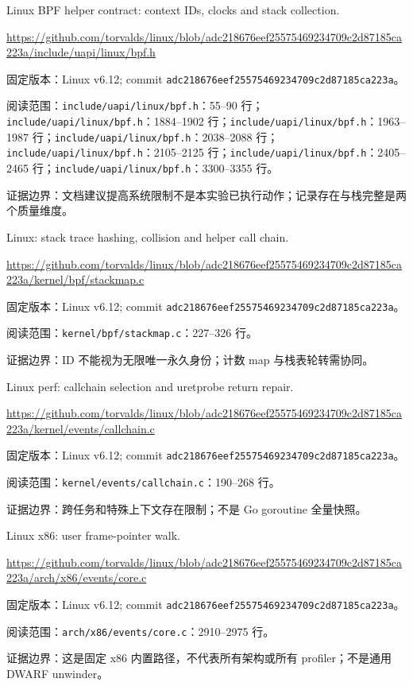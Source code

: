 \documentclass[UTF8,fontset=fandol,openany,11pt]{ctexbook}
\begin{document}
\begin{thebibliography}{999}
 Linux BPF helper contract: context IDs, clocks and stack collection.\par
\url{https://github.com/torvalds/linux/blob/adc218676eef25575469234709c2d87185ca223a/include/uapi/linux/bpf.h}\par
{\small\raggedright 固定版本：Linux v6.12; commit \texttt{adc21867\allowbreak{}6eef2557\allowbreak{}54692347\allowbreak{}09c2d871\allowbreak{}85ca223a}。\par
阅读范围：\nolinkurl{include/uapi/linux/bpf.h}：55–90 行；\nolinkurl{include/uapi/linux/bpf.h}：1884–1902 行；\nolinkurl{include/uapi/linux/bpf.h}：1963–1987 行；\nolinkurl{include/uapi/linux/bpf.h}：2038–2088 行；\nolinkurl{include/uapi/linux/bpf.h}：2105–2125 行；\nolinkurl{include/uapi/linux/bpf.h}：2405–2465 行；\nolinkurl{include/uapi/linux/bpf.h}：3300–3355 行。\par
证据边界：文档建议提高系统限制不是本实验已执行动作；记录存在与栈完整是两个质量维度。
}

 Linux: stack trace hashing, collision and helper call chain.\par
\url{https://github.com/torvalds/linux/blob/adc218676eef25575469234709c2d87185ca223a/kernel/bpf/stackmap.c}\par
{\small\raggedright 固定版本：Linux v6.12; commit \texttt{adc21867\allowbreak{}6eef2557\allowbreak{}54692347\allowbreak{}09c2d871\allowbreak{}85ca223a}。\par
阅读范围：\nolinkurl{kernel/bpf/stackmap.c}：227–326 行。\par
证据边界：ID 不能视为无限唯一永久身份；计数 map 与栈表轮转需协同。
}

 Linux perf: callchain selection and uretprobe return repair.\par
\url{https://github.com/torvalds/linux/blob/adc218676eef25575469234709c2d87185ca223a/kernel/events/callchain.c}\par
{\small\raggedright 固定版本：Linux v6.12; commit \texttt{adc21867\allowbreak{}6eef2557\allowbreak{}54692347\allowbreak{}09c2d871\allowbreak{}85ca223a}。\par
阅读范围：\nolinkurl{kernel/events/callchain.c}：190–268 行。\par
证据边界：跨任务和特殊上下文存在限制；不是 Go goroutine 全量快照。
}

 Linux x86: user frame-pointer walk.\par
\url{https://github.com/torvalds/linux/blob/adc218676eef25575469234709c2d87185ca223a/arch/x86/events/core.c}\par
{\small\raggedright 固定版本：Linux v6.12; commit \texttt{adc21867\allowbreak{}6eef2557\allowbreak{}54692347\allowbreak{}09c2d871\allowbreak{}85ca223a}。\par
阅读范围：\nolinkurl{arch/x86/events/core.c}：2910–2975 行。\par
证据边界：这是固定 x86 内置路径，不代表所有架构或所有 profiler；不是通用 DWARF unwinder。
}


\end{thebibliography}
\end{document}
